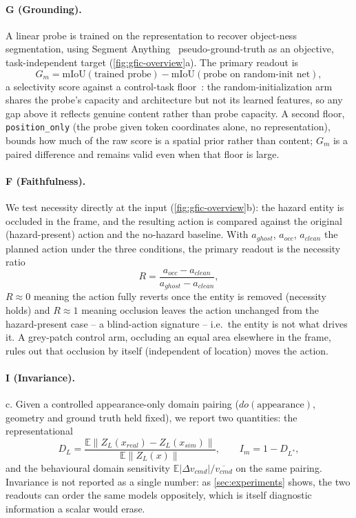 \paragraph{G (Grounding).}
A linear probe is trained on the representation to recover object-ness segmentation,
using Segment Anything~\cite{kirillov2023sam} pseudo-ground-truth as an objective,
task-independent target (\cref{fig:gfic-overview}a). The primary readout is
\begin{equation}
G_m = \mathrm{mIoU}(\text{trained probe}) - \mathrm{mIoU}(\text{probe on random-init net}),
\end{equation}
a selectivity score against a control-task floor~\cite{hewitt2019designing}: the
random-initialization arm shares the probe's capacity and architecture but not its
learned features, so any gap above it reflects genuine content rather than probe
capacity. A second floor, \texttt{position\_only} (the probe given token coordinates
alone, no representation), bounds how much of the raw score is a spatial prior rather
than content; $G_m$ is a paired difference and remains valid even when that floor is
large.

\paragraph{F (Faithfulness).}
We test necessity directly at the input (\cref{fig:gfic-overview}b): the hazard entity is
occluded in the frame, and the resulting action is compared against the original
(hazard-present) action and the no-hazard baseline. With $a_{ghost}$, $a_{occ}$,
$a_{clean}$ the planned action under the three conditions, the primary readout is the
necessity ratio
\begin{equation}
R = \frac{a_{occ} - a_{clean}}{a_{ghost} - a_{clean}},
\end{equation}
$R \approx 0$ meaning the action fully reverts once the entity is removed (necessity
holds) and $R \approx 1$ meaning occlusion leaves the action unchanged from the
hazard-present case -- a blind-action signature -- i.e.\ the entity is not what drives it.
A grey-patch control arm, occluding an equal area elsewhere in the frame, rules out that
occlusion by itself (independent of location) moves the action.

\paragraph{I (Invariance).}
c. Given a controlled appearance-only domain pairing
($do(\text{appearance})$, geometry and
ground truth held fixed), we report two quantities: the representational
\begin{equation}
D_L = \frac{\mathbb{E}\lVert Z_L(x_{real}) - Z_L(x_{sim})\rVert}{\mathbb{E}\lVert Z_L(x)\rVert},
\qquad I_m = 1 - D_{L^*},
\end{equation}
and the behavioural domain sensitivity
$\mathbb{E}|\Delta v_{cmd}| / \overline{v_{cmd}}$ on the same pairing. Invariance is not
reported as a single number: as \cref{sec:experiments} shows, the two readouts can order
the same models oppositely, which is itself diagnostic information a scalar would erase.

